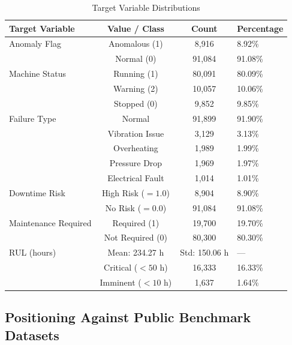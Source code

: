 \begin{table}[!htbp]
\centering
\caption{Target Variable Distributions}
\label{tab:tgt_st}
\small
\renewcommand{\arraystretch}{1.05}
\begin{tabular}{lccl}
\toprule
\textbf{Target Variable} & \textbf{Value / Class} & \textbf{Count} & \textbf{Percentage} \\
\midrule
Anomaly Flag         & Anomalous (1)            & 8,916  & 8.92\%  \\
                     & Normal (0)               & 91,084 & 91.08\% \\
\midrule
Machine Status       & Running (1)              & 80,091 & 80.09\% \\
                     & Warning (2)              & 10,057 & 10.06\% \\
                     & Stopped (0)              & 9,852  & 9.85\%  \\
\midrule
Failure Type         & Normal                   & 91,899 & 91.90\% \\
                     & Vibration Issue          & 3,129  & 3.13\%  \\
                     & Overheating              & 1,989  & 1.99\%  \\
                     & Pressure Drop            & 1,969  & 1.97\%  \\
                     & Electrical Fault         & 1,014  & 1.01\%  \\
\midrule
Downtime Risk        & High Risk ($= 1.0$)      & 8,904  & 8.90\%  \\
                     & No Risk ($= 0.0$)        & 91,084 & 91.08\% \\
\midrule
Maintenance Required & Required (1)             & 19,700 & 19.70\% \\
                     & Not Required (0)         & 80,300 & 80.30\% \\
\midrule
RUL (hours)          & Mean: 234.27 h           & Std: 150.06 h   & --- \\
                     & Critical ($< 50$ h)      & 16,333 & 16.33\% \\
                     & Imminent ($< 10$ h)      & 1,637  & 1.64\%  \\
\bottomrule
\end{tabular}
\end{table}

\subsection{Positioning Against Public Benchmark Datasets}

